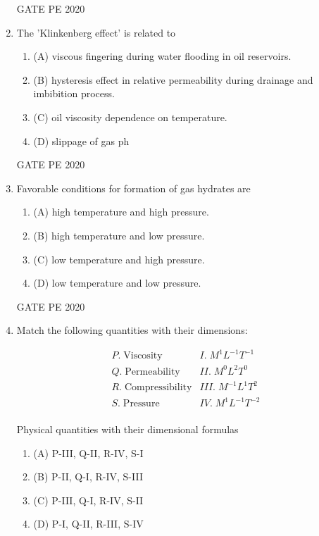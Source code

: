 \documentclass[journal,12pt,onecolumn]{IEEEtran}
\theoremstyle{remark}
\begin{document}
\begin{enumerate}
 
  \hfill{GATE PE 2020}

\item The 'Klinkenberg effect' is related to

\begin{enumerate}
\item (A) viscous fingering during water flooding in oil reservoirs.
\item (B) hysteresis effect in relative permeability during drainage and imbibition process.
\item (C) oil viscosity dependence on temperature.
\item (D) slippage of gas ph
\end{enumerate}

  \hfill{GATE PE 2020}
 
\item Favorable conditions for formation of gas hydrates are

\begin{multicols}{2}
\begin{enumerate}
\item (A) high temperature and high pressure.
\item (B) high temperature and low pressure.
\item (C) low temperature and high pressure.
\item (D) low temperature and low pressure.
\end{enumerate}
\end{multicols}

  \hfill{GATE PE 2020}
   
\item Match the following quantities with their dimensions:

\begin{table}[h!]
\centering
\[
\begin{array}{ll}
P.\; \text{Viscosity}        & I.\; M^{1}L^{-1}T^{-1} \\
Q.\; \text{Permeability}     & II.\; M^{0}L^{2}T^{0} \\
R.\; \text{Compressibility}  & III.\; M^{-1}L^{1}T^{2} \\
S.\; \text{Pressure}         & IV.\; M^{1}L^{-1}T^{-2} \\
\end{array}
\]
\caption{Physical quantities with their dimensional formulas}
\label{tab:dimensions}
\end{table}

   
\begin{multicols}{2}
\begin{enumerate}
\item (A) P-III, Q-II, R-IV, S-I
\item (B) P-II, Q-I, R-IV, S-III
\item (C) P-III, Q-I, R-IV, S-II
\item (D) P-I, Q-II, R-III, S-IV
\end{enumerate}
\end{multicols}


\end{enumerate}
\end{document}
